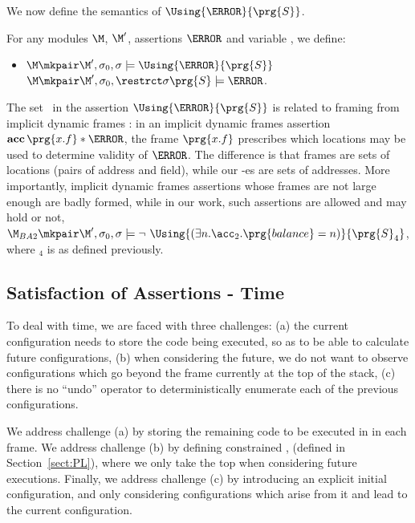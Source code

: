 We now define the semantics of $\Using {\A} {\prg{S}}$.



\begin{definition}[Space]  \label{def:valid:assertion:space} 
For any modules $\M$, $\M'$, assertions $\A$ and variable , we define$:$
\begin{itemize}
\item
 $\M\mkpair \M', \sigma_0 , \sigma \models \Using {\A} {\prg{S}}$
 \IFF
 $\M\mkpair \M', \sigma_0 , \restrct \sigma {\prg{S}} \models  \A  $.
\end{itemize}
\end{definition}

The set \SF\ in the assertion $\Using {\A} {\prg{S}}$ is related to  framing  from implicit dynamic frames \cite{IDF}:
 in an implicit dynamic frames assertion  \ $\textbf{acc}\, \prg{x.f}  * \A$, the frame $\prg{x.f}$ prescribes which locations
 may be used to determine validity of $\A$.
The difference is that frames are sets of locations (pairs of address and field), while our -es are sets of addresses.
 More  importantly,   implicit dynamic frames assertions whose frames are not large enough are badly formed, 
 while in our work, such assertions
are allowed and may   hold %
or not, \eg   %
 $\M_{BA2}\mkpair \M', \sigma_0 , \sigma  \models \neg\ \Using {(\exists n.\acc_2.\prg{balance}=n)} {\prg{S}_4}$,
where $_4$ is as defined previously.
 
 

\subsection{Satisfaction of Assertions - Time}
\label{sect:time} 
To deal with time, we are faced with three challenges: (a) the current configuration needs to store the code being executed, so
as to be able to calculate future configurations, (b) when considering the future, we do not want to observe 
configurations which go beyond the frame currently at the top of the stack, (c) there is no ``undo'' operator to deterministically enumerate
each of the previous configurations. 

We address challenge (a) by storing the remaining code to be executed in  in each frame. 
We address challenge (b) by defining constrained , (defined in Section~\ref{sect:PL}), where we only take the top  when considering future executions.
Finally, we address challenge (c) by introducing an explicit initial configuration, and only considering configurations which arise from it and lead to the current configuration.

